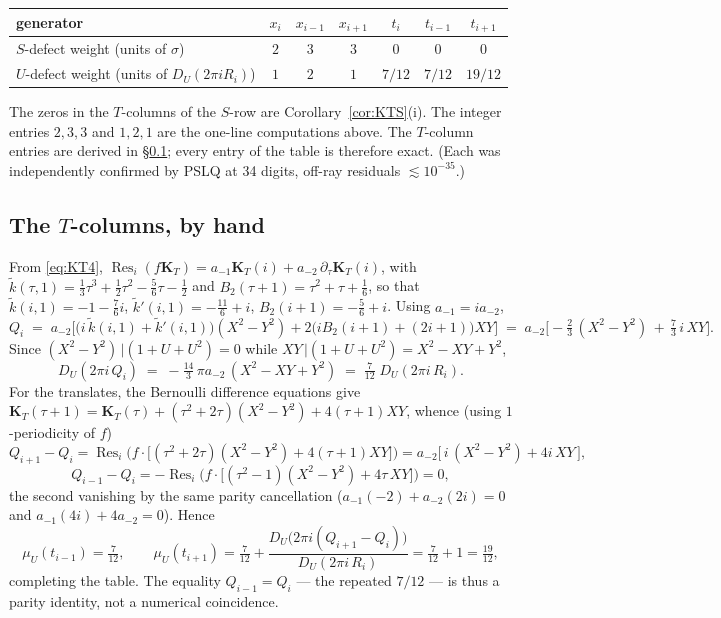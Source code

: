 \documentclass[11pt]{article}
\theoremstyle{definition}
\theoremstyle{remark}
\newcommand{\Res}{\operatorname{Res}}
\newcommand{\tk}{\widetilde{k}}
\newcommand{\KT}{\mathbf{K}_T}
\begin{document}
\begin{center}
\begin{tabular}{lcccccc}
\toprule
generator & $x_i$ & $x_{i-1}$ & $x_{i+1}$ & $t_i$ & $t_{i-1}$ & $t_{i+1}$\\
\midrule
$S$-defect weight (units of $\sigma$) & $2$ & $3$ & $3$ & $0$ & $0$ & $0$\\
$U$-defect weight (units of $D_U(2\pi iR_i)$) & $1$ & $2$ & $1$ & $7/12$ & $7/12$ & $19/12$\\
\bottomrule
\end{tabular}
\end{center}

\noindent
The zeros in the $T$-columns of the $S$-row are Corollary~\ref{cor:KTS}(i).  The integer
entries $2,3,3$ and $1,2,1$ are the one-line computations above.  The $T$-column entries
are derived in \S\ref{sec:Tcols}; every entry of the table is therefore exact.  (Each was
independently confirmed by PSLQ at 34 digits, off-ray residuals $\lesssim10^{-35}$.)

\subsection{The $T$-columns, by hand}\label{sec:Tcols}
From \eqref{eq:KT4}, $\Res_i(f\KT)=a_{-1}\KT(i)+a_{-2}\,\partial_\tau\KT(i)$, with
$\tk(\tau,1)=\tfrac13\tau^3+\tfrac12\tau^2-\tfrac56\tau-\tfrac12$ and
$B_2(\tau+1)=\tau^2+\tau+\tfrac16$, so that
$\tk(i,1)=-1-\tfrac76i$, $\tk'(i,1)=-\tfrac{11}6+i$, $B_2(i+1)=-\tfrac56+i$.
Using $a_{-1}=ia_{-2}$,
\[
Q_i \;=\; a_{-2}\Big[\big(i\,\tk(i,1)+\tk'(i,1)\big)(X^2-Y^2)
+ 2\big(iB_2(i+1)+(2i+1)\big)XY\Big]
\;=\; a_{-2}\Big[-\tfrac23\,(X^2-Y^2) \,+\, \tfrac73\,i\,XY\Big].
\]
Since $(X^2-Y^2)\,|(1+U+U^2)=0$ while $XY\,|(1+U+U^2)=X^2-XY+Y^2$,
\[
D_U(2\pi i\,Q_i) \;=\; -\tfrac{14}{3}\,\pi a_{-2}\,(X^2-XY+Y^2)
\;=\; \tfrac{7}{12}\;D_U(2\pi i\,R_i).
\]
For the translates, the Bernoulli difference equations give
$\KT(\tau+1)=\KT(\tau)+(\tau^2+2\tau)(X^2-Y^2)+4(\tau+1)XY$, whence (using
$1$-periodicity of $f$)
\[
Q_{i+1}-Q_i=\Res_i\!\Big(f\cdot\big[(\tau^2+2\tau)(X^2-Y^2)+4(\tau+1)XY\big]\Big)
= a_{-2}\big[\,i\,(X^2-Y^2)+4i\,XY\,\big],
\]
\[
Q_{i-1}-Q_i=-\Res_i\!\Big(f\cdot\big[(\tau^2-1)(X^2-Y^2)+4\tau\,XY\big]\Big)=0,
\]
the second vanishing by the same parity cancellation
($a_{-1}(-2)+a_{-2}(2i)=0$ and $a_{-1}(4i)+4a_{-2}=0$).  Hence
\[
\mu_U(t_{i-1})=\tfrac7{12},
\qquad
\mu_U(t_{i+1})=\tfrac7{12}+\frac{D_U\big(2\pi i(Q_{i+1}-Q_i)\big)}{D_U(2\pi i\,R_i)}
=\tfrac7{12}+1=\tfrac{19}{12},
\]
completing the table.  The equality $Q_{i-1}=Q_i$ --- the repeated $7/12$ --- is thus a
parity identity, not a numerical coincidence.
\end{document}
